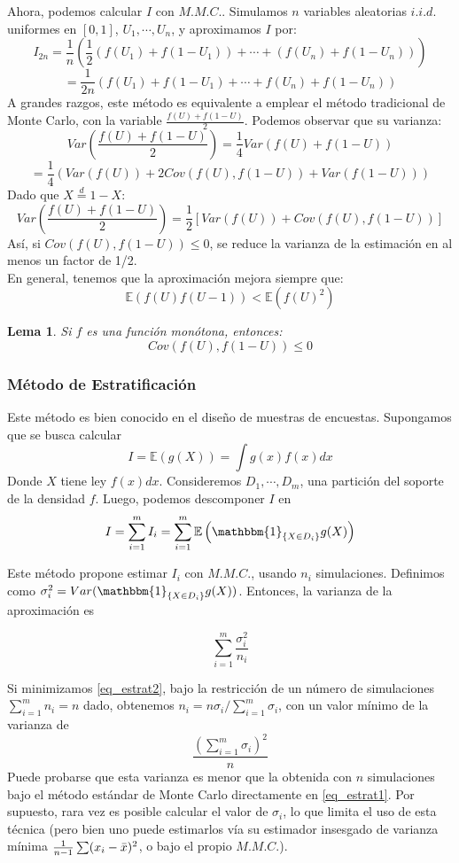 \documentclass[a4paper]{article}
\newtheorem{lem}{Lema}
\numberwithin{equation}{subsection}
\def\E{\mathbb E}
\begin{document}
Ahora, podemos calcular $I$ con $M.M.C.$. Simulamos $n$ variables aleatorias $i.i.d.$ uniformes en $[0,1]$, $U_1,\cdots,U_n$, y aproximamos $I$ por:
\[I_{2n} = \frac{1}{n}\left(\frac{1}{2}(f(U_1)+f(1-U_1))+ \cdots + (f(U_n)+f(1-U_n))\right)\]
\[= \frac{1}{2n}(f(U_1)+f(1-U_1) + \cdots + f(U_n) + f(1-U_n))\]
A grandes razgos, este método es equivalente a emplear el método tradicional de Monte Carlo, con la variable $\frac{f(U)+f(1-U)}{2}$. Podemos observar que su varianza:
\[Var\left(\frac{f(U)+f(1-U)}{2}\right) = \frac{1}{4}Var\left(f(U) + f(1-U)\right)\]
\[= \frac{1}{4}\left(Var\left(f(U)\right) + 2Cov\left(f(U),f(1-U)\right) + Var\left(f(1-U)\right)\right)\]
Dado que $X\overset{d}{=}1-X$:
\[Var\left(\frac{f(U)+f(1-U)}{2}\right) = \frac{1}{2}\left[Var(f(U)) + Cov(f(U),f(1-U))\right]\]
Así, si $Cov(f(U),f(1-U)) \leq 0$, se reduce la varianza de la estimación en al menos un factor de 1/2.\\ \newline
En general, tenemos que la aproximación mejora siempre que:
\[\E\left(f(U)f(U-1)\right) < \E\left(f(U)^2\right)\]

\begin{lem} Si $f$ es una función \textit{monótona}, entonces:
\[Cov(f(U),f(1-U)) \leq0\]
\end{lem}
\subsubsection{Método de Estratificación}
Este método es bien conocido en el diseño de muestras de encuestas. Supongamos que se busca calcular
\[I = \E\left(g(X)\right) = \int g(x)f(x)dx\]
Donde $X$ tiene ley $f(x)dx$. Consideremos $D_1,\cdots,D_m$, una partición del soporte de la densidad $f$. Luego, podemos descomponer $I$ en
\begin{equation}
    I = \sum_{i=1}^m I_i = \sum_{i=1}^m \E\left(\mathbbm{1}_{\{X\in D_i\}}g(X)\right)
    \label{eq_estrat1}
\end{equation}

Este método propone estimar $I_i$ con $M.M.C.$, usando $n_i$ simulaciones. Definimos como $\sigma_i^2 = Var(\mathbbm{1}_{\{X\in D_i\}}g(X))$. Entonces, la varianza de la aproximación es

\begin{equation}
    \sum_{i=1}^m \frac{\sigma_i^2}{n_i}
    \label{eq_estrat2}
\end{equation}

Si minimizamos \ref{eq_estrat2}, bajo la restricción de un número de simulaciones $\sum_{i=1}^m n_i = n$ dado, obtenemos $n_i =n\sigma_i/\sum_{i=1}^m\sigma_i$, con un valor mínimo de la varianza de
\[\frac{\left(\sum_{i=1}^m \sigma_i\right)^2}{n}\]
Puede probarse que esta varianza es menor que la obtenida con $n$ simulaciones bajo el método estándar de Monte Carlo directamente en \ref{eq_estrat1}. Por supuesto, rara vez es posible calcular el valor de $\sigma_i$, lo que limita el uso de esta técnica (pero bien uno puede estimarlos vía su estimador insesgado de varianza mínima $\frac{1}{n-1}\sum (x_i-\Bar{x})^2$, o bajo el propio $M.M.C.$).
\end{document}
